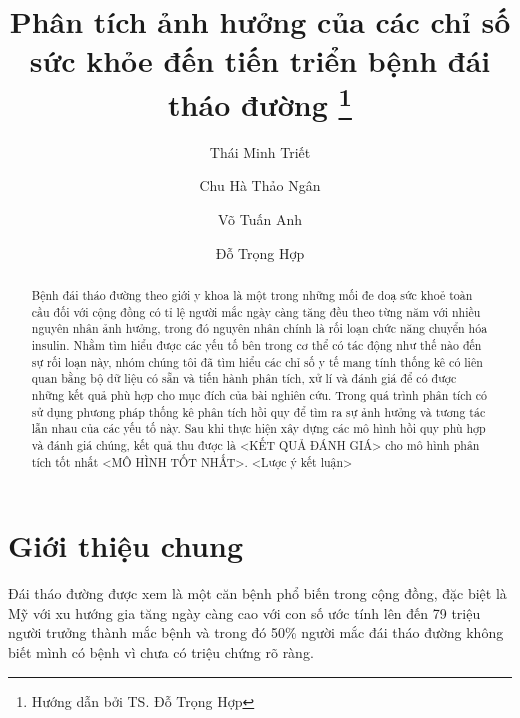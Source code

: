 \documentclass[runningheads]{llncs}
\begin{document}
%
\title{Phân tích ảnh hưởng của các chỉ số sức khỏe đến tiến triển bệnh đái tháo đường \thanks{Hướng dẫn bởi TS. Đỗ Trọng Hợp}}
%
%
\author{Thái Minh Triết \and
Chu Hà Thảo Ngân \and
Võ Tuấn Anh \and
Đỗ Trọng Hợp
}
%
%

%
\maketitle              %
%
\begin{abstract}
Bệnh đái tháo đường theo giới y khoa là một trong những mối đe doạ sức khoẻ toàn cầu đối với cộng đồng có tỉ lệ người mắc ngày càng tăng đều theo từng năm với nhiều nguyên nhân ảnh hưởng, trong đó nguyên nhân chính là rối loạn chức năng chuyển hóa insulin. Nhằm tìm hiểu được các yếu tố bên trong cơ thể có tác động như thế nào đến sự rối loạn này, nhóm chúng tôi đã tìm hiểu các chỉ số y tế mang tính thống kê có liên quan bằng bộ dữ liệu có sẵn và tiến hành phân tích, xử lí và đánh giá để có được những kết quả phù hợp cho mục đích của bài nghiên cứu. Trong quá trình phân tích có sử dụng phương pháp thống kê phân tích hồi quy để tìm ra sự ảnh hưởng và tương tác lẫn nhau của các yếu tố này. Sau khi thực hiện xây dựng các mô hình hồi quy phù hợp và đánh giá chúng, kết quả thu được là <KẾT QUẢ ĐÁNH GIÁ> cho mô hình phân tích tốt nhất <MÔ HÌNH TỐT NHẤT>. <Lược ý kết luận>

\end{abstract}
%
%
%
\section{Giới thiệu chung}

Đái tháo đường được xem là một căn bệnh phổ biến trong cộng đồng, đặc biệt là Mỹ với xu hướng gia tăng ngày càng cao với con số ước tính lên đến 79 triệu người trưởng thành mắc bệnh và trong đó 50\% người mắc đái tháo đường không biết mình có bệnh vì chưa có triệu chứng rõ ràng. 
\end{document}
